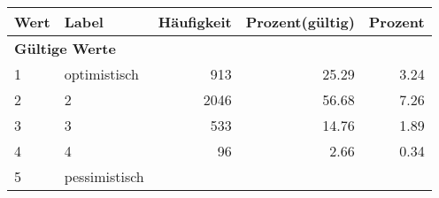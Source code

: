      \begin{longtable}{lXrrr}
     \toprule
     \textbf{Wert} & \textbf{Label} & \textbf{Häufigkeit} & \textbf{Prozent(gültig)} & \textbf{Prozent} \\
     \endhead
     \midrule
     \multicolumn{5}{l}{\textbf{Gültige Werte}}\\

     1 &
     \multicolumn{1}{X}{ optimistisch   } &


       \num{913} &
       \num[round-mode=places,round-precision=2]{25.29} &
         \num[round-mode=places,round-precision=2]{3.24} \\

     2 &
     \multicolumn{1}{X}{ 2   } &


       \num{2046} &
       \num[round-mode=places,round-precision=2]{56.68} &
         \num[round-mode=places,round-precision=2]{7.26} \\

     3 &
     \multicolumn{1}{X}{ 3   } &


       \num{533} &
       \num[round-mode=places,round-precision=2]{14.76} &
         \num[round-mode=places,round-precision=2]{1.89} \\

     4 &
     \multicolumn{1}{X}{ 4   } &


       \num{96} &
       \num[round-mode=places,round-precision=2]{2.66} &
         \num[round-mode=places,round-precision=2]{0.34} \\

     5 &
     \multicolumn{1}{X}{ pessimistisch   } &



\end{longtable}

